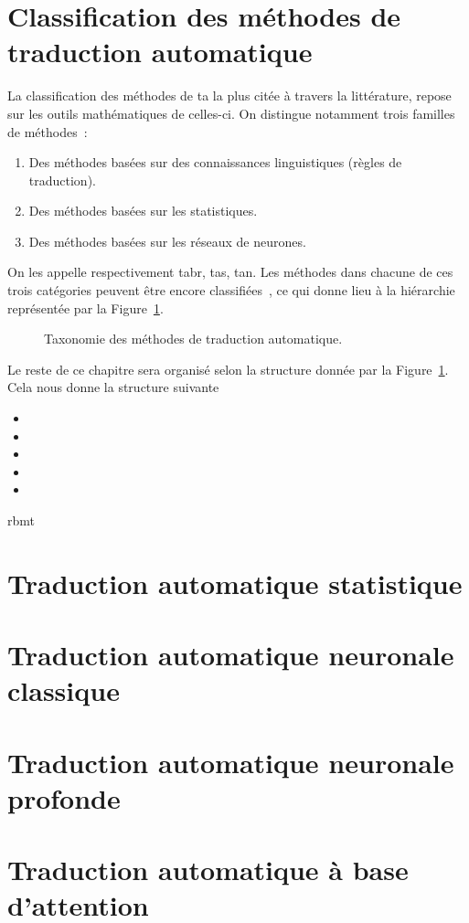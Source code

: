 \section{Classification des méthodes de traduction automatique}

La classification des méthodes de \acrshort{ta} la plus citée à travers la littérature, 
repose sur les outils mathématiques de celles-ci.
On distingue notamment trois familles de méthodes~\cite{deep-nmt-survey}:
\begin{enumerate}
    \item Des méthodes basées sur des connaissances linguistiques (règles de traduction).
    \item Des méthodes basées sur les statistiques.
    \item Des méthodes basées sur les réseaux de neurones.
\end{enumerate}

On les appelle respectivement \Acrfull{tabr}, \Acrfull{tas}, \Acrfull{tan}.
Les méthodes dans chacune de ces trois catégories peuvent être encore classifiées~\cite{deep-nmt-survey,hybrid-mt},
ce qui donne lieu à la hiérarchie représentée par la Figure~\ref{fig:mt-taxonomy-tree}.

\begin{figure}
    \begin{center}
       \resizebox{\textwidth}{!}{
         
       }
    \end{center}
    
    \caption{Taxonomie des méthodes de traduction automatique.}
    \label{fig:mt-taxonomy-tree}
\end{figure}

Le reste de ce chapitre sera organisé selon la structure donnée par la Figure~\ref{fig:mt-taxonomy-tree}. 
Cela nous donne la structure suivante

\begin{itemize}
    \item {}
    \item {}
    \item {}
    \item {}
    \item {}
\end{itemize}

{rbmt}
\section{Traduction automatique statistique}
\label{sec:smt}
\section{Traduction automatique neuronale classique}
\label{sec:nmt-classic}
\section{Traduction automatique neuronale profonde}
\label{sec:dnmt}
\section{Traduction automatique à base d'attention}
\label{sec:nmt-attention}
